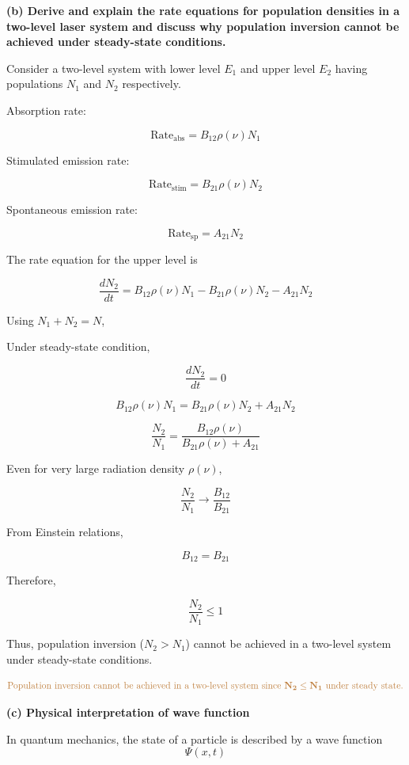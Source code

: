 \documentclass[a4paper, 12pt]{article}
\begin{document}
\vspace{0.8cm}

\textbf{(b) Derive and explain the rate equations for population densities in a two-level laser system and discuss why population inversion cannot be achieved under steady-state conditions.}

Consider a two-level system with lower level $E_1$ and upper level $E_2$ having populations $N_1$ and $N_2$ respectively.

Absorption rate:

\[
\text{Rate}_{\text{abs}} = B_{12} \rho(\nu) N_1
\]

Stimulated emission rate:

\[
\text{Rate}_{\text{stim}} = B_{21} \rho(\nu) N_2
\]

Spontaneous emission rate:

\[
\text{Rate}_{\text{sp}} = A_{21} N_2
\]

The rate equation for the upper level is

\[
\frac{dN_2}{dt}
=
B_{12}\rho(\nu)N_1
-
B_{21}\rho(\nu)N_2
-
A_{21}N_2
\]

Using $N_1 + N_2 = N$,

Under steady-state condition,

\[
\frac{dN_2}{dt}=0
\]

\[
B_{12}\rho(\nu)N_1
=
B_{21}\rho(\nu)N_2
+
A_{21}N_2
\]

\[
\frac{N_2}{N_1}
=
\frac{B_{12}\rho(\nu)}
{B_{21}\rho(\nu) + A_{21}}
\]

Even for very large radiation density $\rho(\nu)$,

\[
\frac{N_2}{N_1}
\rightarrow
\frac{B_{12}}{B_{21}}
\]

From Einstein relations,

\[
B_{12} = B_{21}
\]

Therefore,

\[
\frac{N_2}{N_1} \leq 1
\]

Thus, population inversion ($N_2 > N_1$) cannot be achieved in a two-level system under steady-state conditions.

\[
\textcolor{brown}{\mathbf{\text{Population inversion cannot be achieved in a two-level system since } N_2 \leq N_1 \text{ under steady state.}}}
\]


\textbf{(c) Physical interpretation of wave function}

In quantum mechanics, the state of a particle is described by a wave function 
\[
\Psi(x,t)
\]
\end{document}
